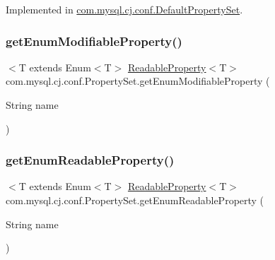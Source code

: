 Implemented in \mbox{\hyperlink{classcom_1_1mysql_1_1cj_1_1conf_1_1_default_property_set_aac90679a7d9bf30e9f122be52f095384}{com.\+mysql.\+cj.\+conf.\+Default\+Property\+Set}}.

\mbox{\label{interfacecom_1_1mysql_1_1cj_1_1conf_1_1_property_set_ac4b27fd4d71b53f1af527c93058fec49}} 
\subsubsection{\texorpdfstring{get\+Enum\+Modifiable\+Property()}{getEnumModifiableProperty()}}
{\footnotesize\ttfamily $<$T extends Enum$<$T$>$ \mbox{\hyperlink{interfacecom_1_1mysql_1_1cj_1_1conf_1_1_readable_property}{Readable\+Property}}$<$T$>$ com.\+mysql.\+cj.\+conf.\+Property\+Set.\+get\+Enum\+Modifiable\+Property (\begin{DoxyParamCaption}\item[{String}]{name }\end{DoxyParamCaption})}

\mbox{\label{interfacecom_1_1mysql_1_1cj_1_1conf_1_1_property_set_a01113d885888a4c9a4ac334af5f2deae}} 
\subsubsection{\texorpdfstring{get\+Enum\+Readable\+Property()}{getEnumReadableProperty()}}
{\footnotesize\ttfamily $<$T extends Enum$<$T$>$ \mbox{\hyperlink{interfacecom_1_1mysql_1_1cj_1_1conf_1_1_readable_property}{Readable\+Property}}$<$T$>$ com.\+mysql.\+cj.\+conf.\+Property\+Set.\+get\+Enum\+Readable\+Property (\begin{DoxyParamCaption}\item[{String}]{name }\end{DoxyParamCaption})}

